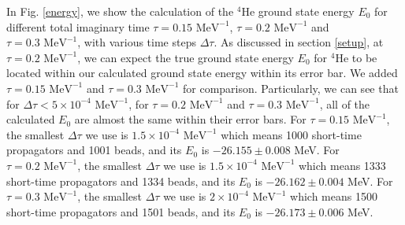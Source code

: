 \documentclass[12pt,letterpaper,UTF8]{report}
\begin{document}
In Fig. \ref{energy}, we show the calculation of the $^4$He ground state energy $E_0$ for different total imaginary time $\tau=0.15\textrm{ MeV}^{-1}$, $\tau=0.2\textrm{ MeV}^{-1}$ and $\tau=0.3\textrm{ MeV}^{-1}$,
with various time steps $\Delta \tau$.
As discussed in section \ref{setup},
at $\tau=0.2\textrm{ MeV}^{-1}$,
we can expect the true ground state energy $E_0$ for $^4$He to be located within our calculated ground state energy within its error bar.
We added $\tau=0.15\textrm{ MeV}^{-1}$ and $\tau=0.3\textrm{ MeV}^{-1}$ for comparison.
Particularly, we can see that for $\Delta \tau < 5 \times 10^{-4} \textrm{ MeV}^{-1}$, for $\tau=0.2\textrm{ MeV}^{-1}$ and $\tau=0.3\textrm{ MeV}^{-1}$, all of the calculated $E_0$ are almost the same within their error bars.
For $\tau=0.15\textrm{ MeV}^{-1}$, the smallest $\Delta \tau$ we use is $1.5 \times 10^{-4} \textrm{ MeV}^{-1}$ which means 1000 short-time propagators and 1001 beads, and its $E_0$ is $-26.155 \pm 0.008$ MeV.
For $\tau=0.2\textrm{ MeV}^{-1}$, the smallest $\Delta \tau$ we use is $1.5 \times 10^{-4} \textrm{ MeV}^{-1}$ which means 1333 short-time propagators and 1334 beads, and its $E_0$ is $-26.162 \pm 0.004$ MeV.
For $\tau=0.3\textrm{ MeV}^{-1}$, the smallest $\Delta \tau$ we use is $2 \times 10^{-4} \textrm{ MeV}^{-1}$ which means 1500 short-time propagators and 1501 beads, and its $E_0$ is $-26.173 \pm 0.006$ MeV.
\end{document}
